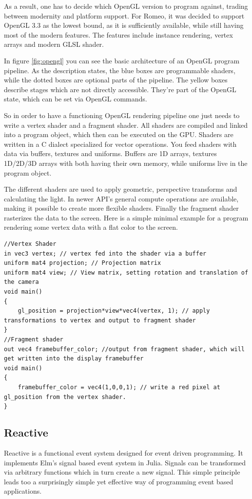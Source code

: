 As a result, one has to decide which \ac{OpenGL} version to program against, trading between modernity and platform support.
For Romeo, it was decided to support \ac{OpenGL} 3.3 as the lowest bound, as it is sufficiently available, while still having most of the modern features.
The features include instance rendering, vertex arrays and modern \ac{GLSL} shader.

In figure \ref{fig:opengl} you can see the basic architecture of an OpenGL program pipeline.
As the description states, the blue boxes are programmable shaders, while the dotted boxes are optional parts of the pipeline.
The yellow boxes describe stages which are not directly accessible. They're part of the OpenGL state, which can be set via OpenGL commands.

So in order to have a functioning OpenGL rendering pipeline one just needs to write a vertex shader and a fragment shader.
All shaders are compiled and linked into a program object, which then can be executed on the \ac{GPU}.
Shaders are written in a C dialect specialized for vector operations. 
You feed shaders with data via buffers, textures and uniforms. Buffers are 1D arrays, textures 1D/2D/3D arrays with both having their own memory, while uniforms live in the program object.

The different shaders are used to apply geometric, perspective transforms and calculating the light.
In newer API's general compute operations are available, making it possible to create more flexible shaders.
Finally the fragment shader rasterizes the data to the screen.
Here is a simple minimal example for a program rendering some vertex data with a flat color to the screen.


\begin{lstlisting}
//Vertex Shader
in vec3 vertex; // vertex fed into the shader via a buffer
uniform mat4 projection; // Projection matrix
uniform mat4 view; // View matrix, setting rotation and translation of the camera
void main()
{
    gl_position = projection*view*vec4(vertex, 1); // apply transformations to vertex and output to fragment shader
}
//Fragment shader
out vec4 framebuffer_color; //output from fragment shader, which will get written into the display framebuffer
void main()
{
    framebuffer_color = vec4(1,0,0,1); // write a red pixel at gl_position from the vertex shader.
}
\end{lstlisting}

\subsection{Reactive}
Reactive is a functional event system designed for event driven programming.
It implements Elm's signal based event system in Julia.
Signals can be transformed via arbitrary functions which in turn create a new signal.
This simple principle leads too a surprisingly simple yet effective way of programming event based applications.


